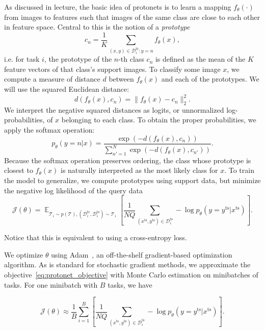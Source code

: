 \documentclass[12pt]{article}
\DeclareMathOperator{\E}{\mathbb{E}}
\newcommand{\task}{\mathcal{T}}
\newcommand{\supportdata}{\mathcal{D}^\mathrm{tr}}
\newcommand{\querydata}{\mathcal{D}^\mathrm{ts}}
\newcommand{\query}[1]{{#1}^\mathrm{ts}}
\begin{document}
    As discussed in lecture, the basic idea of protonets is to learn a mapping $f_\theta(\cdot)$ from images to features such that images of the same class are close to each other in feature space. Central to this is the notion of a \emph{prototype}
    \begin{equation}
        c_n = \frac{1}{K} \sum_{(x,y) \in \supportdata_i : y = n} f_\theta(x),
    \end{equation}
    i.e. for task $i$, the prototype of the $n$-th class $c_n$ is defined as the mean of the $K$ feature vectors of that class's support images.
    To classify some image $x$, we compute a measure of distance $d$ between $f_\theta(x)$ and each of the prototypes. We will use the squared Euclidean distance:
    \begin{equation}
        d(f_\theta(x), c_n) = \lVert f_\theta(x) - c_n \rVert_2^2.
    \end{equation}
    We interpret the negative squared distances as logits, or unnormalized log-probabilities, of $x$ belonging to each class. To obtain the proper probabilities, we apply the softmax operation:
    \begin{equation}
        p_\theta(y=n|x) = \frac{\exp(-d(f_\theta(x), c_n))}{\sum_{n'=1}^N \exp(-d(f_\theta(x), c_{n'}))}.
    \end{equation}
    Because the softmax operation preserves ordering, the class whose prototype is closest to $f_\theta(x)$ is naturally interpreted as the most likely class for $x$. To train the model to generalize, we compute prototypes using support data, but minimize the negative log likelihood of the query data
    \begin{equation}
        \mathcal{J}(\theta) = \E_{\task_i \sim p(\task), (\supportdata_i, \querydata_i) \sim \task_i} \left[ \frac{1}{NQ} \sum_{(\query{x},\query{y}) \in \querydata_i} - \log p_\theta(y = \query{y} | \query{x}) \right].
        \label{eq:protonet_objective}
    \end{equation}

    Notice that this is equivalent to using a cross-entropy loss.

    We optimize $\theta$ using Adam~\cite{kingma2014adam}, an off-the-shelf gradient-based optimization algorithm.
    As is standard for stochastic gradient methods, we approximate the objective~\eqref{eq:protonet_objective} with Monte Carlo estimation on minibatches of tasks. For one minibatch with $B$ tasks, we have

    \begin{equation}
        \mathcal{J}(\theta) \approx \frac{1}{B} \sum_{i=1}^B
        \left[ \frac{1}{NQ} \sum_{(\query{x},\query{y}) \in \querydata_i} - \log p_\theta(y = \query{y} | \query{x}) \right].
        \label{eq:protonet_objective_minibatch}
    \end{equation}
\end{document}

